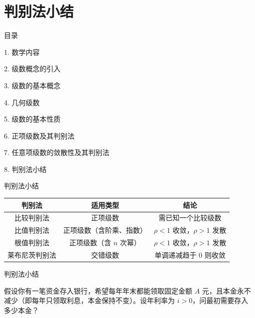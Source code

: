 \documentclass[aspectratio=169,10pt,fontset=fandol]{ctexbeamer}
\begin{document}
\section{判别法小结}
\begin{frame}[t,fragile]{目录}
\normalsize
{\color{black}\normalsize 1. 数学内容\par}\vspace{0.3em}
{\color{black}\normalsize 2. 级数概念的引入\par}\vspace{0.3em}
{\color{black}\normalsize 3. 级数的基本概念\par}\vspace{0.3em}
{\color{black}\normalsize 4. 几何级数\par}\vspace{0.3em}
{\color{black}\normalsize 5. 级数的基本性质\par}\vspace{0.3em}
{\color{black}\normalsize 6. 正项级数及其判别法\par}\vspace{0.3em}
{\color{black}\normalsize 7. 任意项级数的敛散性及其判别法\par}\vspace{0.3em}
{\color{blue}\normalsize 8. 判别法小结\par}\vspace{0.3em}
\end{frame}
\begin{frame}[t,fragile]{判别法小结}
\footnotesize
{\footnotesize
\begin{tabular}{|c|c|c|}
\hline
\textbf{判别法} & \textbf{适用类型} & \textbf{结论} \\
\hline
比较判别法 & 正项级数 & 需已知一个比较级数 \\
\hline
比值判别法 & 正项级数（含阶乘、指数） & \(\rho < 1\) 收敛，\(\rho > 1\) 发散 \\
\hline
根值判别法 & 正项级数（含 \(n\) 次幂） & \(\rho < 1\) 收敛，\(\rho > 1\) 发散 \\
\hline
莱布尼茨判别法 & 交错级数 & 单调递减趋于 0 则收敛 \\
\hline
\end{tabular}
}
\end{frame}
\begin{frame}[t,fragile]{判别法小结}
\footnotesize
{\footnotesize
\begin{application}

假设你有一笔资金存入银行，希望每年年末都能领取固定金额 \(A\) 元，且本金永不减少（即每年只领取利息，本金保持不变）。设年利率为 \(i>0\)，问最初需要存入多少本金？


\end{application}
}
\end{frame}
\end{document}
